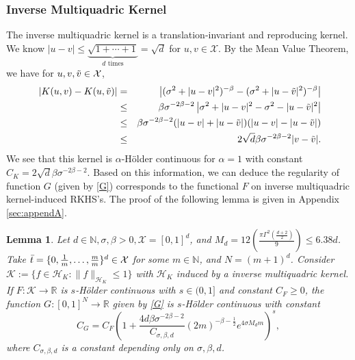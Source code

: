 \documentclass{article}
\def\NN{\mathbb N}
\def\RR{\mathbb R}
\numberwithin{equation}{section}
\newtheorem{lemma}[theorem]{Lemma}
\begin{document}
\subsubsection{Inverse Multiquadric Kernel}
The inverse multiquadric kernel 
is a translation-invariant and reproducing kernel.  
We know $|u-v|\leq \underbrace{\sqrt{1+\cdots+1}}_{d \text{ times}}=\sqrt{d}$ for $u,v \in \mathcal{X}$. 
By the Mean Value Theorem, we have for $u,v,\Tilde{v} \in \mathcal{X}$,
\begin{eqnarray*}     
\  | K(u,v) - K(u,\Tilde{v})| &= &\left|(\sigma^2 + |u-v|^2)^{-\beta}- (\sigma^2 + |u-\Tilde{v}|^2)^{-\beta}\right| \\
&\leq& \beta \sigma^{-2\beta-2} \left|\sigma^2 +|u-v|^2- \sigma^2 -|u-\Tilde{v}|^2\right|\\
&\leq& \beta   \sigma^{-2\beta-2} (|u-v|+|u-\Tilde{v}|)(|u-v|-|u-\Tilde{v}|)\\
&\leq&2\sqrt{d}\beta  \sigma^{-2\beta-2}|v-\Tilde{v}|.
\end{eqnarray*}
We see that this kernel is $\alpha$-H\"{o}lder continuous for $\alpha = 1$ with constant $C_K = 2\sqrt{d}\beta  \sigma^{-2\beta-2}$. 
Based on this information, we can deduce the regularity of function $G$ (given by \eqref{G}) corresponds to the functional $F$ on inverse multiquadric kernel-induced RKHS's. The proof of the following lemma is given in Appendix \ref{sec:appendA}.

\begin{lemma}\label{lemma: C_G_multi}
     Let $d\in \NN, \sigma,\beta >0, \mathcal{X} = [0,1]^d$, and $M_d = 12 \left(\frac{\pi \Gamma^2(\frac{d+2}{2})}{9}\right) \leq 6.38d$. Take $\Bar{t}=\{ 0, \frac{1}{m},\ldots, \frac{m}{m}\}^d \in \mathcal{X}$ for some $m\in \NN$, and $N=(m+1)^d$.
     Consider $
    \mathcal{K} := \{f\in \mathcal{H}_K: \|f\|_{\mathcal{H}_K} \leq 1\}$
 with $\mathcal{H}_K$ induced by a inverse multiquadric kernel. 
If $F: \mathcal{K}\to \RR$ is  $s$-H\"{o}lder continuous with $s \in (0,1]$ and constant $C_F\geq 0$, the function $G:[0,1]^N \rightarrow \RR$ given by \eqref{G} is $s$-H\"{o}lder continuous with constant
\begin{equation}\label{C_G_multi}
    C_G = C_F\left(1+ \frac{4d\beta \sigma^{-2\beta-2}}{C_{\sigma, \beta,d}}(2m)^{-\beta -\frac{1}{2}}e^{4\sigma M_d m}\right)^s,
\end{equation}
where $C_{\sigma, \beta,d}$ is a constant depending only on $\sigma, \beta,d$.
\end{lemma}
\end{document}
